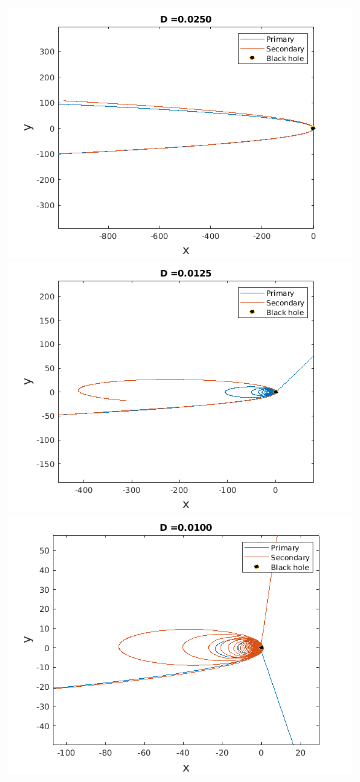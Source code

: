 \documentclass[a4paper]{article}
\begin{document}
\begin{enumerate} [label*=\textbf{(\alph*)}]
\begin{figure} [h]
\begin{subfigure} {.425\linewidth}
						\includegraphics[width=\linewidth, height =.55\linewidth] {../plots/3f/retrograde_orbits/3.png}\\
						\includegraphics[width=\linewidth, height =.55\linewidth] {../plots/3f/retrograde_orbits/2.png}\\
						\includegraphics[width=\linewidth, height =.55\linewidth] {../plots/3f/retrograde_orbits/1.png}
					\end{subfigure} %
					\hspace{1cm}

\end{figure}
\end{enumerate}
\end{document}

